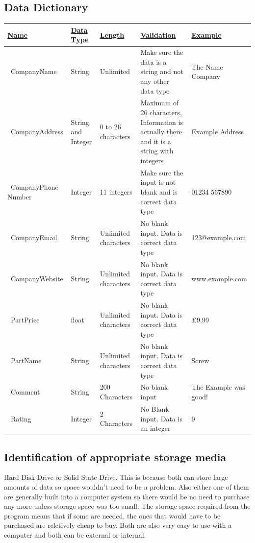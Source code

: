 \subsection{Data Dictionary}
\begin{center}
\begin{tabular}{ | m{3cm} | m{2cm} | m{2cm} | m{3cm} | m{3cm} | } 
\hline
\underline{\bf Name}& \bf\underline{Data Type} & \bf\underline{Length} & \bf\underline{Validation} & \bf\underline{Example}

\\
\hline
\ CompanyName & String & Unlimited & Make sure the data is a string and not any other data type & The Name Company\\ 
\hline
\ CompanyAddress & String and Integer & 0 to 26 characters & Maximum of 26 characters, Information is actually there and it is a string with integers & Example Address\\
\hline
\ CompanyPhone Number & Integer & 11 integers & Make sure the input is not blank and is correct data type & 01234 567890\\
\hline
\ CompanyEmail & String & Unlimited characters & No blank input. Data is correct data type & 123@example.com\\
\hline
\ CompanyWebsite & String & Unlimited characters & No blank input. Data is correct data type & www.example.com\\
\hline
\ PartPrice & float & Unlimited characters & No blank input. Data is correct data type & £9.99\\
\hline
\ PartName & String & Unlimited characters & No blank input. Data is correct data type & Screw\\
\hline
\ Comment & String & 200 Characters & No blank input & The Example was good!\\
\hline
\ Rating & Integer & 2 Characters & No Blank input. Data is an integer & 9\\
\hline
\end{tabular}
\end{center}
\subsection{Identification of appropriate storage media}
Hard Disk Drive or Solid State Drive. This is because both can store large amounts of data so space wouldn't need to be a problem. Also either one of them are generally built into a computer system so there would be no need to purchase any more unless storage space was too small. The storage space required from the program means that if some are needed, the ones that would have to be purchased are reletively cheap to buy. Both are also very easy to use with a computer and both can be external or internal. 
